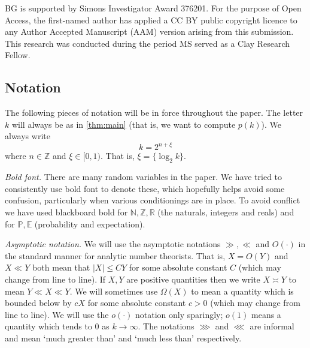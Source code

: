 \documentclass[11pt,reqno]{amsart}
\numberwithin{equation}{section}
\theoremstyle{definition}
\theoremstyle{remark}
\newcommand{\mb}{\mathbb}
\renewcommand{\le}{\leqslant}
\newcommand\Z{\mathbb{Z}}
\newcommand\R{\mathbb{R}}
\newcommand\N{\mathbb{N}}
\begin{document}
BG is supported by Simons Investigator Award 376201. For the purpose of Open Access, the first-named author has applied a CC BY public copyright licence to any Author Accepted Manuscript (AAM) version arising from this submission. This research was conducted during the period MS served as a Clay Research Fellow. 

\subsection{Notation} 

The following pieces of notation will be in force throughout the paper. The letter $k$ will always be as in \cref{thm:main} (that is, we want to compute $p(k)$). We always write
\begin{equation}\label{k-integer-decomp} k = 2^{n + \xi}
\end{equation} where $n \in \Z$ and $\xi \in [0,1)$. That is, $\xi = \{ \log_2 k\}$. \vspace*{8pt}

\emph{Bold font.} There are many random variables in the paper. We have tried to consistently use bold font to denote these, which hopefully helps avoid some confusion, particularly when various conditionings are in place. To avoid conflict we have used blackboard bold for $\N, \Z, \R$ (the naturals, integers and reals) and for $\mb{P}, \mb{E}$ (probability and expectation).\vspace*{8pt}

\emph{Asymptotic notation.} We will use the asymptotic notations $\gg, \ll$ and $O(\cdot)$ in the standard manner for analytic number theorists. That is, $X = O(Y)$ and $X \ll Y$ both mean that $|X| \le C Y$ for some absolute constant $C$ (which may change from line to line). If $X, Y$ are positive quantities then we write $X \asymp Y$ to mean $Y \ll X \ll Y$. We will sometimes use $\Omega(X)$ to mean a quantity which is bounded below by $cX$ for some absolute constant $c > 0$ (which may change from line to line). We will use the $o(\cdot)$ notation only sparingly; $o(1)$ means a quantity which tends to $0$ as $k \rightarrow \infty$. The notations $\ggg$ and $\lll$ are informal and mean `much greater than' and `much less than' respectively.\vspace*{8pt}
\end{document}
